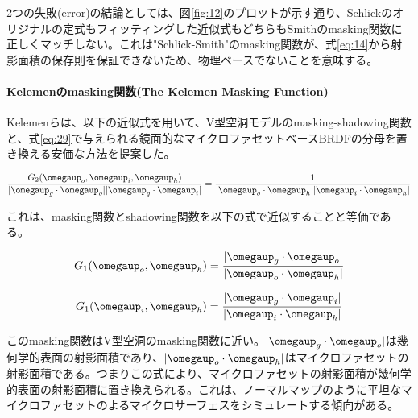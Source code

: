 \documentclass[a4j,xelatex,ja=standard]{bxjsarticle}
\begin{document}
2つの失敗(error)の結論としては、図\ref{fig:12}のプロットが示す通り、Schlickのオリジナルの定式もフィッティングした近似式もどちらもSmithのmasking関数に正しくマッチしない。これは"Schlick-Smith"のmasking関数が、式\ref{eq:14}から射影面積の保存則を保証できないため、物理ベースでないことを意味する。

\paragraph{Kelemenのmasking関数(The Kelemen Masking Function)}

Kelemenらは、以下の近似式を用いて、V型空洞モデルのmasking-shadowing関数と、式\eqref{eq:29}で与えられる鏡面的なマイクロファセットベースBRDFの分母を置き換える安価な方法を提案した。

\begin{equation}
    \frac{G_2(\boldsymbol{\omegaup}_o, \boldsymbol{\omegaup}_i, \boldsymbol{\omegaup}_h)}{|\boldsymbol{\omegaup}_g \cdot \boldsymbol{\omegaup}_o| |\boldsymbol{\omegaup}_g \cdot \boldsymbol{\omegaup}_i|} = \frac{1}{|\boldsymbol{\omegaup}_o \cdot \boldsymbol{\omegaup}_h| |\boldsymbol{\omegaup}_i \cdot \boldsymbol{\omegaup}_h|}
    \label{eq:58}
\end{equation}

これは、masking関数とshadowing関数を以下の式で近似することと等価である。

\begin{equation}
    G_1(\boldsymbol{\omegaup}_o, \boldsymbol{\omegaup}_h) = \frac{|\boldsymbol{\omegaup}_g \cdot \boldsymbol{\omegaup}_o|}{|\boldsymbol{\omegaup}_o \cdot \boldsymbol{\omegaup}_h|}
    \label{eq:59}
\end{equation}

\begin{equation}
    G_1(\boldsymbol{\omegaup}_i, \boldsymbol{\omegaup}_h) = \frac{|\boldsymbol{\omegaup}_g \cdot \boldsymbol{\omegaup}_i|}{|\boldsymbol{\omegaup}_i \cdot \boldsymbol{\omegaup}_h|}
    \label{eq:60}
\end{equation}

このmasking関数はV型空洞のmasking関数に近い。$|\boldsymbol{\omegaup}_g \cdot \boldsymbol{\omegaup}_o|$は幾何学的表面の射影面積であり、$|\boldsymbol{\omegaup}_o \cdot \boldsymbol{\omegaup}_h|$はマイクロファセットの射影面積である。つまりこの式により、マイクロファセットの射影面積が幾何学的表面の射影面積に置き換えられる。これは、ノーマルマップのように平坦なマイクロファセットのよるマイクロサーフェスをシミュレートする傾向がある。
\end{document}
